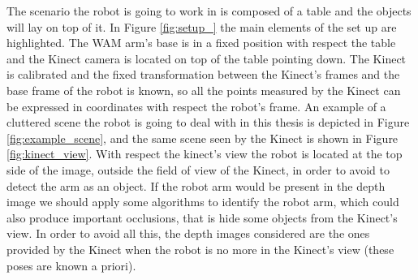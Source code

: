 The scenario the robot is going to work in is composed of a table and the objects will lay on top of it. In Figure \ref{fig:setup_} the main elements of the set up are highlighted. The WAM arm's base is in a fixed position with respect the table and the Kinect camera is located on top of the table pointing down. The Kinect is calibrated and the fixed transformation between the Kinect's frames and the base frame of the robot is known, so all the points measured by the Kinect can be expressed in coordinates with respect the robot's frame. An example of a cluttered scene the robot is going to deal with in this thesis is depicted in Figure \ref{fig:example_scene}, and the same scene seen by the Kinect is shown in Figure \ref{fig:kinect_view}. With respect the kinect's view the robot is located at the top side of the image, outside the field of view of the Kinect, in order to avoid to detect the arm as an object. If the robot arm would be present in the depth image we should apply some algorithms to identify the robot arm, which could also produce important occlusions, that is hide some objects from the Kinect's view. In order to avoid all this, the depth images considered are the ones provided by the Kinect when the robot is no more in the Kinect's view (these poses are known a priori). 


